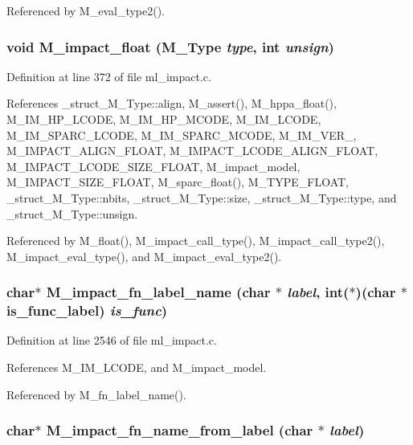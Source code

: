 Referenced by M\_\-eval\_\-type2().
\subsubsection{\setlength{\rightskip}{0pt plus 5cm}void M\_\-impact\_\-float (\bf{M\_\-Type} {\em type}, int {\em unsign})}\label{m__impact_8h_d94006697d99ac56f4256f80d5af0a73}




Definition at line 372 of file ml\_\-impact.c.

References \_\-struct\_\-M\_\-Type::align, M\_\-assert(), M\_\-hppa\_\-float(), M\_\-IM\_\-HP\_\-LCODE, M\_\-IM\_\-HP\_\-MCODE, M\_\-IM\_\-LCODE, M\_\-IM\_\-SPARC\_\-LCODE, M\_\-IM\_\-SPARC\_\-MCODE, M\_\-IM\_\-VER\_, M\_\-IMPACT\_\-ALIGN\_\-FLOAT, M\_\-IMPACT\_\-LCODE\_\-ALIGN\_\-FLOAT, M\_\-IMPACT\_\-LCODE\_\-SIZE\_\-FLOAT, M\_\-impact\_\-model, M\_\-IMPACT\_\-SIZE\_\-FLOAT, M\_\-sparc\_\-float(), M\_\-TYPE\_\-FLOAT, \_\-struct\_\-M\_\-Type::nbits, \_\-struct\_\-M\_\-Type::size, \_\-struct\_\-M\_\-Type::type, and \_\-struct\_\-M\_\-Type::unsign.

Referenced by M\_\-float(), M\_\-impact\_\-call\_\-type(), M\_\-impact\_\-call\_\-type2(), M\_\-impact\_\-eval\_\-type(), and M\_\-impact\_\-eval\_\-type2().
\subsubsection{\setlength{\rightskip}{0pt plus 5cm}char$\ast$ M\_\-impact\_\-fn\_\-label\_\-name (char $\ast$ {\em label}, int($\ast$)(char $\ast$is\_\-func\_\-label) {\em is\_\-func})}\label{m__impact_8h_f316ca56f8d396b8a66ededaf48cc47c}




Definition at line 2546 of file ml\_\-impact.c.

References M\_\-IM\_\-LCODE, and M\_\-impact\_\-model.

Referenced by M\_\-fn\_\-label\_\-name().
\subsubsection{\setlength{\rightskip}{0pt plus 5cm}char$\ast$ M\_\-impact\_\-fn\_\-name\_\-from\_\-label (char $\ast$ {\em label})}\label{m__impact_8h_5979949472a3ff0de008104e3a0a5659}




